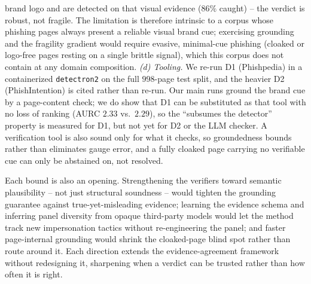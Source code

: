 brand logo and are detected on that visual evidence ($86\%$ caught) -- the verdict is robust,
not fragile. The limitation is therefore intrinsic to a corpus whose phishing pages always
present a reliable visual brand cue; exercising grounding and the fragility gradient would
require evasive, minimal-cue phishing (cloaked or logo-free pages resting on a single brittle
signal), which this corpus does not contain at any domain composition. \emph{(d) Tooling.} We re-run D1
(Phishpedia) in a containerized \texttt{detectron2} on the full $998$-page test split, and the
heavier D2 (PhishIntention) is cited rather than re-run.
Our main runs ground the brand cue by a page-content check; we do show that D1 can be
substituted as that tool with no loss of ranking (AURC $2.33$ vs.\ $2.29$), so the
``subsumes the detector'' property is measured for D1, but not yet for D2 or the LLM checker. A verification tool is
also sound only for what it checks, so groundedness bounds rather than eliminates gauge
error, and a fully cloaked page carrying no verifiable cue can only be abstained on, not
resolved.

Each bound is also an opening. Strengthening the verifiers toward semantic
plausibility -- not just structural soundness -- would tighten the grounding guarantee
against true-yet-misleading evidence; learning the evidence schema and inferring panel
diversity from opaque third-party models would let the method track new impersonation
tactics without re-engineering the panel; and faster page-internal grounding would
shrink the cloaked-page blind spot rather than route around it. Each direction extends
the evidence-agreement framework without redesigning it, sharpening when a verdict can
be trusted rather than how often it is right.
